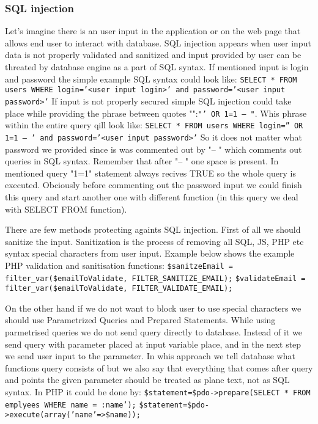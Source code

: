 \documentclass{article}[12pt]
\begin{document}
\subsubsection{SQL injection}
Let's imagine there is an user input in the application or on the web page that allows end user to interact with database. SQL injection appears when
user input data is not properly validated and sanitized and input provided by user can be threated by database engine as a part of SQL syntax. If mentioned input is login and password the simple example SQL syntax could look like:
\newline
\texttt{SELECT * FROM users WHERE login='<user input login>' and password='<user input password>'}
\newline
If input is not properly secured simple SQL injection could take place while providing the phrase between quotes "":\texttt{"' OR 1=1 -- "}. Whis phrase within the entire query qill look like:
\newline
\texttt{SELECT * FROM users WHERE login='' OR 1=1 -- ' and password='<user input password>'}
So it does not matter what password we provided since is was commented out by "-- " which comments out queries in SQL syntax. Remember that after "-- " one space is present.
In mentioned query "1=1" statement always recives TRUE so the whole query is executed. Obciously before commenting out the password input we could finish this query and start another one with different function (in this query we deal with SELECT FROM function).

There are few methods protecting againts SQL injection. First of all we should sanitize the input. Sanitization is the process of removing all SQL, JS, PHP etc syntax special characters from user input. Example below shows the example PHP validation and sanitisation functions:
\newline
\newline
\texttt{\$sanitzeEmail = filter\_var(\$emailToValidate, FILTER\_SANITIZE\_EMAIL);}
\newline
\texttt{\$validateEmail = filter\_var(\$emailToValidate, FILTER\_VALIDATE\_EMAIL);}
\newline

On the other hand if we do not want to block user to use special characters we should use Parametrized Queries and Prepared Statements. While using parmetrised queries we do not send query directly to database. Instead of it we send query with parameter placed at input variable place, and in the next step we send user input to the parameter.
In whis approach we tell database what functions query consists of but we also say that everything that comes after query and points the given parameter should be treated as plane text, not as SQL syntax. In PHP it could be done by:
\newline
\newline
\texttt{\$statement=\$pdo->prepare(SELECT * FROM emplyees WHERE name = :name');}
\newline
\texttt{\$statement=\$pdo->execute(array('name'=>\$name));}
\newline
\end{document}
